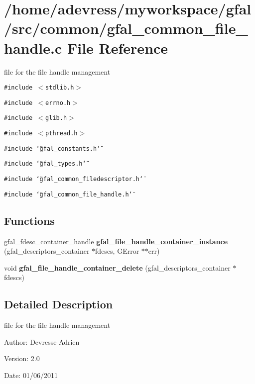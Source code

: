 \section{/home/adevress/myworkspace/gfal/src/common/gfal\_\-common\_\-file\_\-handle.c File Reference}
\label{gfal__common__file__handle_8c}
file for the file handle management 

{\tt \#include $<$stdlib.h$>$}\par
{\tt \#include $<$errno.h$>$}\par
{\tt \#include $<$glib.h$>$}\par
{\tt \#include $<$pthread.h$>$}\par
{\tt \#include \char`\"{}gfal\_\-constants.h\char`\"{}}\par
{\tt \#include \char`\"{}gfal\_\-types.h\char`\"{}}\par
{\tt \#include \char`\"{}gfal\_\-common\_\-filedescriptor.h\char`\"{}}\par
{\tt \#include \char`\"{}gfal\_\-common\_\-file\_\-handle.h\char`\"{}}\par
\subsection*{Functions}
\begin{CompactItemize}
\item 
gfal\_\-fdesc\_\-container\_\-handle \textbf{gfal\_\-file\_\-handle\_\-container\_\-instance} (gfal\_\-descriptors\_\-container $\ast$fdescs, GError $\ast$$\ast$err)\label{gfal__common__file__handle_8c_38d580e0e1bd4b15a3473d731fb94ca0}

\item 
void \textbf{gfal\_\-file\_\-handle\_\-container\_\-delete} (gfal\_\-descriptors\_\-container $\ast$fdescs)\label{gfal__common__file__handle_8c_a0951d6d30a9ea82a6d5c84cd29092d5}

\end{CompactItemize}


\subsection{Detailed Description}
file for the file handle management 

\begin{Desc}
\item[Author:]Devresse Adrien \end{Desc}
\begin{Desc}
\item[Version:]2.0 \end{Desc}
\begin{Desc}
\item[Date:]01/06/2011 \end{Desc}
